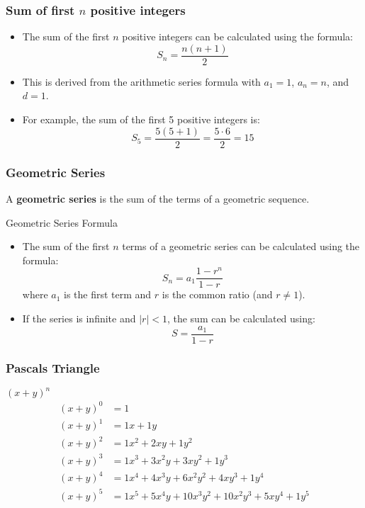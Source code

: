 \begin{frame}
    \frametitle{Sum of first \(n\) positive integers}
    \begin{itemize}
        \item The sum of the first \(n\) positive integers can be calculated using the formula:
        \[
            S_n = \frac{n(n+1)}{2}
        \]
        \item This is derived from the arithmetic series formula with \(a_1 = 1\), \(a_n = n\), and \(d = 1\).
        \item For example, the sum of the first 5 positive integers is:
        \[
            S_5 = \frac{5(5+1)}{2} = \frac{5 \cdot 6}{2} = 15
        \]
    \end{itemize}       

\end{frame}

\begin{frame}
    \frametitle{Geometric Series}
    \begin{definition}
        A \textbf{geometric series} is the sum of the terms of a geometric sequence.
    \end{definition}
    \begin{block}{Geometric Series Formula}
        \begin{itemize}
            \item The sum of the first \(n\) terms of a geometric series can be calculated using the formula:
            \[
                S_n = a_1 \frac{1 - r^n}{1 - r}
            \]
            where \(a_1\) is the first term and \(r\) is the common ratio (and \(r \neq 1\)).
            \item If the series is infinite and \(|r| < 1\), the sum can be calculated using:
            \[
                S = \frac{a_1}{1 - r}
            \]
        \end{itemize}
    \end{block} 
\end{frame}

\begin{frame}
 \frametitle{Pascals Triangle}
 \begin{block}{\( {(x+y)}^{n} \)}
 \begin{align*}
 {(x+y)}^{0} &= 1 \\
 {(x+y)}^{1} &= 1x + 1y \\
 {(x+y)}^{2} &= 1x^{2} + 2xy + 1y^{2} \\
 {(x+y)}^{3} &= 1x^{3} + 3x^{2}y + 3xy^{2} + 1y^{3}\\
 {(x+y)}^{4} &= 1x^{4} + 4x^{3}y + 6x^{2}y^{2} + 4xy^{3} + 1y^{4} \\
 {(x+y)}^{5} &= 1x^{5} + 5x^{4}y + 10x^{3}y^{2} + 10x^{2}y^{3} + 5xy^{4} + 1y^{5} \\
 \end{align*}
 \end{block}
\end{frame}

